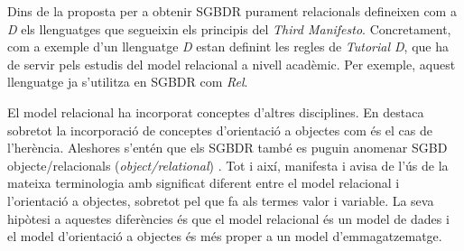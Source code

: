 Dins de la proposta per a obtenir SGBDR purament relacionals
\textcite{date06:_datab_types_relat_model,date:tutoriald} defineixen
com a \emph{D} els llenguatges que segueixin els principis del
\emph{Third Manifesto}. Concretament, com a exemple d'un llenguatge
\emph{D} estan definint les regles de \emph{Tutorial D}, que ha de
servir pels estudis del model relacional a nivell acadèmic. Per
exemple, aquest llenguatge ja s'utilitza en SGBDR com \emph{Rel}.


El model relacional ha incorporat conceptes d'altres disciplines. En
destaca sobretot la incorporació de conceptes d'orientació a objectes
com és el cas de l'herència.  Aleshores s'entén que els SGBDR també es
puguin anomenar SGBD objecte/relacionals (\emph{object/relational})
\parencite{date02:foundation}.  Tot i així, \textcite[cap.~6]{date06}
manifesta i avisa de l'ús de la mateixa terminologia amb significat
diferent entre el model relacional i l'orientació a objectes, sobretot
pel que fa als termes valor i variable. %
La seva hipòtesi a aquestes diferències és que el model relacional és
un model de dades i el model d'orientació a objectes és més proper a
un model
d'emmagatzematge. %



